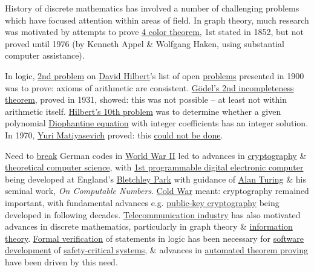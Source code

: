 \documentclass{article}
\begin{document}
History of discrete mathematics has involved a number of challenging problems which have focused attention within areas of field. In graph theory, much research was motivated by attempts to prove \href{https://en.wikipedia.org/wiki/Four_color_theorem}{4 color theorem}, 1st stated in 1852, but not proved until 1976 (by {\sc Kenneth Appel \& Wolfgang Haken}, using substantial computer assistance).

In logic, \href{https://en.wikipedia.org/wiki/Hilbert%27s_second_problem}{2nd problem} on \href{https://en.wikipedia.org/wiki/David_Hilbert}{\sc David Hilbert}'s list of open \href{https://en.wikipedia.org/wiki/Hilbert%27s_problems}{problems} presented in 1900 was to prove: axioms of arithmetic are consistent. \href{https://en.wikipedia.org/wiki/G%C3%B6del%27s_second_incompleteness_theorem}{G\"odel's 2nd incompleteness theorem}, proved in 1931, showed: this was not possible -- at least not within arithmetic itself. \href{https://en.wikipedia.org/wiki/Hilbert%27s_tenth_problem}{Hilbert's 10th problem} was to determine whether a given polynomial \href{https://en.wikipedia.org/wiki/Diophantine_equation}{Diophantine equation} with integer coefficients has an integer solution. In 1970, \href{https://en.wikipedia.org/wiki/Yuri_Matiyasevich}{\sc Yuri Matiyasevich} proved: this \href{https://en.wikipedia.org/wiki/Matiyasevich%27s_theorem}{could not be done}.

Need to \href{https://en.wikipedia.org/wiki/Cryptanalysis}{break} German codes in \href{https://en.wikipedia.org/wiki/World_War_II}{World War II} led to advances in \href{https://en.wikipedia.org/wiki/Cryptography}{cryptography} \& \href{https://en.wikipedia.org/wiki/Theoretical_computer_science}{theoretical computer science}, with \href{https://en.wikipedia.org/wiki/Colossus_computer}{1st programmable digital electronic computer} being developed at England's \href{https://en.wikipedia.org/wiki/Bletchley_Park}{Bletchley Park} with guidance of \href{https://en.wikipedia.org/wiki/Alan_Turing}{\sc Alan Turing} \& his seminal work, {\it On Computable Numbers}. \href{https://en.wikipedia.org/wiki/Cold_War}{Cold War} meant: cryptography remained important, with fundamental advances e.g. \href{https://en.wikipedia.org/wiki/Public-key_cryptography}{public-key cryptography} being developed in following decades. \href{https://en.wikipedia.org/wiki/Telecommunications_industry}{Telecommunication industry} has also motivated advances in discrete mathematics, particularly in graph theory \& \href{https://en.wikipedia.org/wiki/Information_theory}{information theory}. \href{https://en.wikipedia.org/wiki/Formal_verification}{Formal verification} of statements in logic has been necessary for \href{https://en.wikipedia.org/wiki/Software_development}{software development} of \href{https://en.wikipedia.org/wiki/Safety-critical_system}{safety-critical systems}, \& advances in \href{https://en.wikipedia.org/wiki/Automated_theorem_proving}{automated theorem proving} have been driven by this need.
\end{document}
